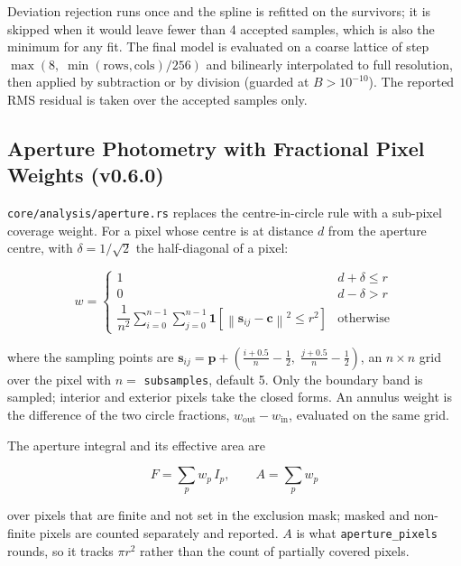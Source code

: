 \documentclass[11pt,a4paper]{article}
\newcommand{\code}[1]{\texttt{\small #1}}
\begin{document}
    Deviation rejection runs once and the spline is refitted on the survivors; it is skipped when it would leave fewer than 4 accepted samples, which is also the minimum for any fit. The final model is evaluated on a coarse lattice of step $\max\!\left(8,\; \min(\text{rows},\text{cols})/256\right)$ and bilinearly interpolated to full resolution, then applied by subtraction or by division (guarded at $B > 10^{-10}$). The reported RMS residual is taken over the accepted samples only.

    \subsection{Aperture Photometry with Fractional Pixel Weights (v0.6.0)}
    \label{sec:aperture_photometry}

    \code{core/analysis/aperture.rs} replaces the centre-in-circle rule with a sub-pixel coverage weight. For a pixel whose centre is at distance $d$ from the aperture centre, with $\delta = 1/\sqrt{2}$ the half-diagonal of a pixel:

    \begin{equation}
        w = \begin{cases}
            1 & d + \delta \le r \\[4pt]
            0 & d - \delta > r \\[4pt]
            \dfrac{1}{n^2} \displaystyle\sum_{i=0}^{n-1} \sum_{j=0}^{n-1} \mathbf{1}\!\left[\left\| \mathbf{s}_{ij} - \mathbf{c} \right\|^2 \le r^2\right] & \text{otherwise}
        \end{cases}
    \end{equation}

    where the sampling points are $\mathbf{s}_{ij} = \mathbf{p} + \left(\tfrac{i + 0.5}{n} - \tfrac{1}{2},\; \tfrac{j + 0.5}{n} - \tfrac{1}{2}\right)$, an $n \times n$ grid over the pixel with $n = $ \code{subsamples}, default 5. Only the boundary band is sampled; interior and exterior pixels take the closed forms. An annulus weight is the difference of the two circle fractions, $w_{\text{out}} - w_{\text{in}}$, evaluated on the same grid.

    The aperture integral and its effective area are

    \begin{equation}
        F = \sum_{p} w_p \, I_p, \qquad A = \sum_{p} w_p
    \end{equation}

    over pixels that are finite and not set in the exclusion mask; masked and non-finite pixels are counted separately and reported. $A$ is what \code{aperture\_pixels} rounds, so it tracks $\pi r^2$ rather than the count of partially covered pixels.
\end{document}
